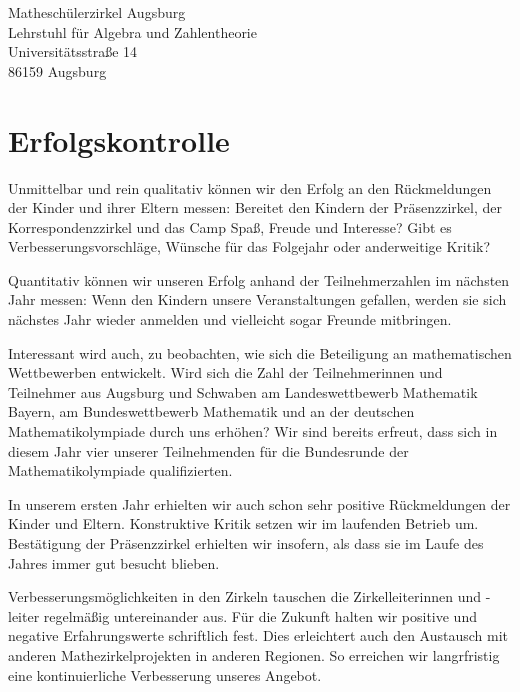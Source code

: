 \documentclass[12pt]{zettel}
\begin{document}
\begin{tabbing}
  Matheschülerzirkel Augsburg \\
  Lehrstuhl für Algebra und Zahlentheorie \\
  Universitätsstraße 14 \\
  86159 Augsburg
\end{tabbing}


\section{Erfolgskontrolle}

Unmittelbar und rein qualitativ können wir den Erfolg an den Rückmeldungen der
Kinder und ihrer Eltern messen: Bereitet den Kindern der Präsenzzirkel, der
Korrespondenzzirkel und das Camp Spaß, Freude und Interesse? Gibt es
Verbesserungsvorschläge, Wünsche für das Folgejahr oder anderweitige Kritik?

Quantitativ können wir unseren Erfolg anhand der Teilnehmerzahlen im nächsten
Jahr messen: Wenn den Kindern unsere Veranstaltungen gefallen, werden sie sich
nächstes Jahr wieder anmelden und vielleicht sogar Freunde mitbringen.

Interessant wird auch, zu beobachten, wie sich die Beteiligung an
mathematischen Wettbewerben entwickelt. Wird sich die Zahl der
Teilnehmerinnen und Teilnehmer aus Augsburg und Schwaben am Landeswettbewerb
Mathematik Bayern, am Bundeswettbewerb Mathematik und an der deutschen
Mathematikolympiade durch uns erhöhen? Wir sind bereits erfreut,
dass sich in diesem Jahr vier unserer Teilnehmenden für die
Bundesrunde der Mathematikolympiade qualifizierten.

In unserem ersten Jahr erhielten wir auch schon sehr positive Rückmeldungen der
Kinder und Eltern. Konstruktive Kritik setzen wir im laufenden Betrieb um. Bestätigung der Präsenzzirkel erhielten wir insofern, als dass sie im Laufe des Jahres immer gut besucht blieben.

Verbesserungsmöglichkeiten in den Zirkeln tauschen die Zirkelleiterinnen und -leiter regelmäßig untereinander aus. Für die Zukunft halten wir positive und negative Erfahrungswerte schriftlich fest. Dies erleichtert auch den Austausch mit anderen Mathezirkelprojekten in anderen Regionen. So erreichen wir langrfristig eine kontinuierliche Verbesserung unseres Angebot.
\end{document}

